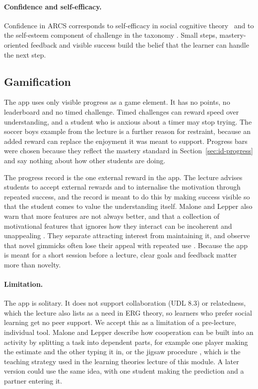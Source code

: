 \paragraph{Confidence and self-efficacy.} Confidence in ARCS corresponds to self-efficacy in social cognitive theory~\cite{Bandura1977,Bandura1986} and to the self-esteem component of challenge in the taxonomy \cite[pp.~232--233]{Malone1987}. Small steps, mastery-oriented feedback and visible success build the belief that the learner can handle the next step.

\subsection{Gamification}\label{sec:id-gamification}
The app uses only visible progress as a game element. It has no points, no leaderboard and no timed challenge. Timed challenges can reward speed over understanding, and a student who is anxious about a timer may stop trying. The soccer boys example from the lecture is a further reason for restraint, because an added reward can replace the enjoyment it was meant to support. Progress bars were chosen because they reflect the mastery standard in Section~\ref{sec:id-progress} and say nothing about how other students are doing.

The progress record is the one external reward in the app. The lecture advises students to accept external rewards and to internalise the motivation through repeated success, and the record is meant to do this by making success visible so that the student comes to value the understanding itself. Malone and Lepper also warn that more features are not always better, and that a collection of motivational features that ignores how they interact can be incoherent and unappealing \cite[pp.~247--248]{Malone1987}. They separate attracting interest from maintaining it, and observe that novel gimmicks often lose their appeal with repeated use \cite[p.~247]{Malone1987}. Because the app is meant for a short session before a lecture, clear goals and feedback matter more than novelty.

\paragraph{Limitation.} The app is solitary. It does not support collaboration (UDL 8.3) or relatedness, which the lecture also lists as a need in ERG theory, so learners who prefer social learning get no peer support. We accept this as a limitation of a pre-lecture, individual tool. Malone and Lepper describe how cooperation can be built into an activity by splitting a task into dependent parts, for example one player making the estimate and the other typing it in, or the jigsaw procedure \cite[p.~243]{Malone1987}, which is the teaching strategy used in the learning theories lecture of this module. A later version could use the same idea, with one student making the prediction and a partner entering it.